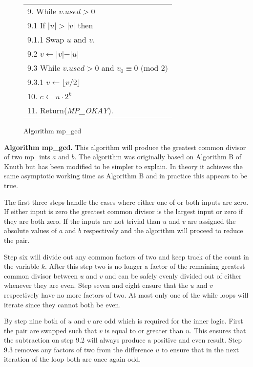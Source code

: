 \documentclass[b5paper]{book}
\begin{document}
\begin{figure}[!here]
\begin{small}
\begin{center}
\begin{tabular}{l}
9.  While $v.used > 0$ \\
\hspace{3mm}9.1  If $\vert u \vert > \vert v \vert$ then \\
\hspace{6mm}9.1.1  Swap $u$ and $v$. \\
\hspace{3mm}9.2  $v \leftarrow \vert v \vert - \vert u \vert$ \\
\hspace{3mm}9.3  While $v.used > 0$ and $v_0 \equiv 0 \mbox{ (mod }2\mbox{)}$ \\
\hspace{6mm}9.3.1  $v \leftarrow \lfloor v / 2 \rfloor$ \\
10.  $c \leftarrow u \cdot 2^k$ \\
11.  Return(\textit{MP\_OKAY}). \\
\hline
\end{tabular}
\end{center}
\end{small}
\caption{Algorithm mp\_gcd}
\end{figure}
\textbf{Algorithm mp\_gcd.}
This algorithm will produce the greatest common divisor of two mp\_ints $a$ and $b$.  The algorithm was originally based on Algorithm B of
Knuth \cite[pp. 338]{TAOCPV2} but has been modified to be simpler to explain.  In theory it achieves the same asymptotic working time as
Algorithm B and in practice this appears to be true.  

The first three steps handle the cases where either one of or both inputs are zero.  If either input is zero the greatest common divisor is the 
largest input or zero if they are both zero.  If the inputs are not trivial than $u$ and $v$ are assigned the absolute values of 
$a$ and $b$ respectively and the algorithm will proceed to reduce the pair.

Step six will divide out any common factors of two and keep track of the count in the variable $k$.  After this step two is no longer a
factor of the remaining greatest common divisor between $u$ and $v$ and can be safely evenly divided out of either whenever they are even.  Step 
seven and eight ensure that the $u$ and $v$ respectively have no more factors of two.  At most only one of the while loops will iterate since 
they cannot both be even.

By step nine both of $u$ and $v$ are odd which is required for the inner logic.  First the pair are swapped such that $v$ is equal to
or greater than $u$.  This ensures that the subtraction on step 9.2 will always produce a positive and even result.  Step 9.3 removes any
factors of two from the difference $u$ to ensure that in the next iteration of the loop both are once again odd.
\end{document}
